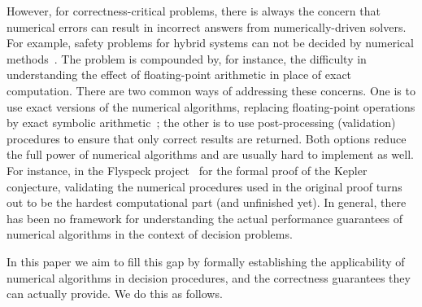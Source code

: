\documentclass[prodmode]{acmsmall} %
\begin{document}
However, for correctness-critical problems, there is always the concern that numerical errors can result in incorrect answers from numerically-driven solvers. For example, safety problems for hybrid systems can not be decided by numerical methods~\cite{andre07}. The problem is compounded by, for instance, the difficulty in understanding the effect of floating-point arithmetic in place of exact computation. There are two common ways of addressing these concerns. One is to use exact versions of the numerical algorithms, replacing floating-point operations by exact symbolic arithmetic~\cite{bern}; the other is to use post-processing (validation) procedures to ensure that only correct results are returned. Both options reduce the full power of numerical algorithms and are usually hard to implement as well. For instance, in the Flyspeck project~\cite{DBLP:conf/dagstuhl/Hales05} for the formal proof of the Kepler conjecture, validating the numerical procedures used in the original proof turns out to be the hardest computational part (and unfinished yet). In general, there has been no framework for understanding the actual performance guarantees of numerical algorithms in the context of decision problems. 

In this paper we aim to fill this gap by formally establishing the applicability of numerical algorithms in decision procedures, and the correctness guarantees they can actually provide. We do this as follows.
\end{document}
